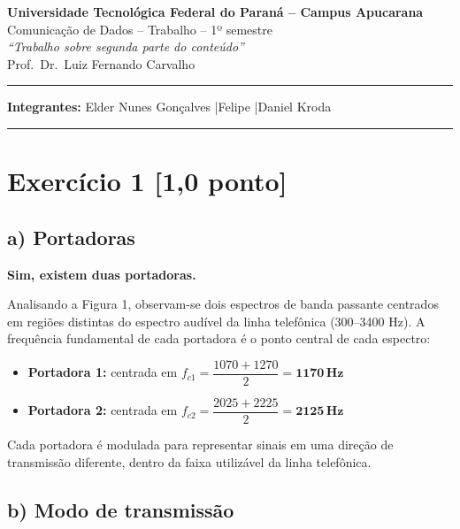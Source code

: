 \documentclass[12pt,a4paper]{article}
\begin{document}
\begin{center}
    {\large\bfseries Universidade Tecnológica Federal do Paraná -- Campus Apucarana}\\[4pt]
    {\large Comunicação de Dados -- Trabalho -- 1º semestre}\\[2pt]
    {\large\itshape ``Trabalho sobre segunda parte do conteúdo''}\\[4pt]
    {\normalsize Prof.\ Dr.\ Luiz Fernando Carvalho}\\[6pt]
    \hrule
    \vspace{6pt}
    {\normalsize \textbf{Integrantes:} Elder Nunes Gonçalves \quad|\quad Felipe \quad|\quad Daniel Kroda}\\[4pt]
    \hrule
\end{center}

\vspace{1em}

\section*{Exercício 1 \hfill \normalfont\small[1,0 ponto]}

\subsection*{a) Portadoras}

\textbf{Sim, existem duas portadoras.}

Analisando a Figura 1, observam-se dois espectros de banda passante centrados em regiões distintas do espectro audível da linha telefônica (300--3400 Hz). A frequência fundamental de cada portadora é o ponto central de cada espectro:

\begin{itemize}
    \item \textbf{Portadora 1:} centrada em $f_{c1} = \dfrac{1070 + 1270}{2} = \mathbf{1170\,Hz}$
    \item \textbf{Portadora 2:} centrada em $f_{c2} = \dfrac{2025 + 2225}{2} = \mathbf{2125\,Hz}$
\end{itemize}

Cada portadora é modulada para representar sinais em uma direção de transmissão diferente, dentro da faixa utilizável da linha telefônica.

\subsection*{b) Modo de transmissão}
\end{document}
